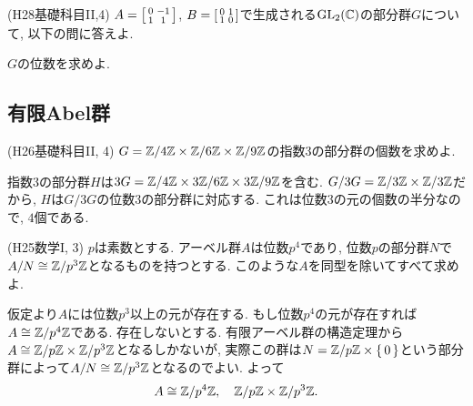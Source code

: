 \begin{egprob} (H28基礎科目II,4)
$A= \left[\begin{smallmatrix}0&-1\\ 1&1\end{smallmatrix}\right]$, $B=\left[\begin{smallmatrix}0&1\\1&0\end{smallmatrix}\right]$で生成される$\mathrm{GL}_{2}(\mathbb{C})$の部分群$G$について, 以下の問に答えよ.
\ben
\item $G$の位数を求めよ.
\een
\end{egprob}




\subsection{有限Abel群}
\begin{egprob} (H26基礎科目II, 4)
$G = \mathbb{Z}/4\mathbb{Z}\times \mathbb{Z}/6\mathbb{Z}\times \mathbb{Z}/9\mathbb{Z}$の指数3の部分群の個数を求めよ.
\end{egprob}
\begin{egans}
指数3の部分群$H$は$3G = \mathbb{Z}/4\mathbb{Z}\times 3\mathbb{Z}/6\mathbb{Z}\times 3\mathbb{Z}/9\mathbb{Z}$を含む. $G/3G = \mathbb{Z}/3\mathbb{Z}\times \mathbb{Z}/3\mathbb{Z}$だから, $H$は$G/3G$の位数3の部分群に対応する. これは位数3の元の個数の半分なので, $4$個である.
\end{egans}

\begin{egprob} (H25数学I, 3) \label{prob:H25-I-3}
$p$は素数とする. アーベル群$A$は位数$p^4$であり, 位数$p$の部分群$N$で$A/N\cong \mathbb{Z}/p^3\mathbb{Z}$となるものを持つとする. このような$A$を同型を除いてすべて求めよ.
\end{egprob}

\begin{egans}
仮定より$A$には位数$p^3$以上の元が存在する. もし位数$p^4$の元が存在すれば$A\cong \mathbb{Z}/p^4\mathbb{Z}$である. 存在しないとする. 有限アーベル群の構造定理から$A\cong \mathbb{Z}/p\mathbb{Z} \times \mathbb{Z}/p^3\mathbb{Z}$となるしかないが, 実際この群は$N = \mathbb{Z}/p\mathbb{Z}\times \set{0}$という部分群によって$A/N \cong \mathbb{Z}/p^3\mathbb{Z}$となるのでよい. よって
\[A\cong \mathbb{Z}/p^4\mathbb{Z}, \quad \mathbb{Z}/p\mathbb{Z}\times \mathbb{Z}/p^3\mathbb{Z}. \]
\end{egans}






\newpage
